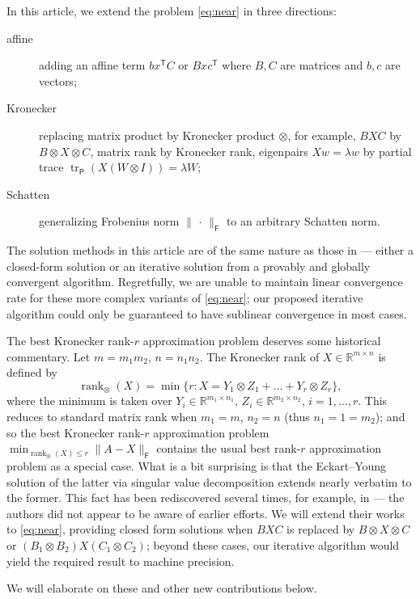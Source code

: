 \documentclass[11pt,reqno]{amsart}
\newcommand{\tp}{{\scriptscriptstyle\mathsf{T}}}
\newcommand{\F}{{\scriptscriptstyle\mathsf{F}}}
\newcommand{\Par}{{\scriptscriptstyle\mathsf{P}}}
\DeclareMathOperator{\rank}{rank}
\DeclareMathOperator{\tr}{tr}
\theoremstyle{definition}
\numberwithin{equation}{section}
\newcommand{\R}{\mathbb{R}}
\begin{document}
In this article, we extend the problem \eqref{eq:near} in three directions:
\begin{description}
\item[affine] adding an affine term $bx^\tp C$ or $Bx c^\tp$ where $B,C$ are matrices and $b,c$ are vectors;

\item[Kronecker] replacing matrix product by Kronecker product $\otimes$, for example, $BXC$ by $B \otimes X \otimes C$, matrix rank by Kronecker rank, eigenpairs $Xw = \lambda w$ by partial trace $\tr_\Par(X(W \otimes I)) = \lambda W$;

\item[Schatten] generalizing Frobenius norm $\lVert \, \cdot \, \rVert_\F$ to an arbitrary Schatten norm.
\end{description}
The solution methods in this article are of the same nature as those in \cite{li22}  --- either a closed-form solution or an iterative solution from a provably and globally convergent algorithm. Regretfully, we are unable to maintain linear convergence rate for these more complex variants of \eqref{eq:near}; our proposed iterative algorithm could only be guaranteed to have sublinear convergence in most cases.

The best Kronecker rank-$r$ approximation problem deserves some historical commentary. Let $m = m_1 m_2$, $n = n_1n_2$. The Kronecker rank of $X \in  \mathbb{R}^{m \times n}$ is defined by
\[
\rank_\otimes(X) = \min \{ r : X = Y_1 \otimes Z_1 + \dots + Y_r \otimes Z_r\},
\]
where the minimum is taken over $Y_i \in \R^{m_1 \times n_1}$, $Z_i \in \R^{m_2 \times n_2}$, $i =1,\dots,r$. This reduces to standard matrix rank when $m_1 = m$, $n_2 = n$ (thus $n_1 = 1 = m_2$); and so the best Kronecker rank-$r$ approximation problem $\min_{\rank_\otimes(X) \le r} \lVert A- X\rVert_\F $ contains the usual  best rank-$r$ approximation problem as a special case. What is a bit surprising is that the Eckart--Young solution of the latter \cite{Eck} via singular value decomposition extends nearly verbatim to the former. This fact has been rediscovered several times, for example, in \cite{allen,kon, vanLoan} --- the authors did not appear to be aware of earlier efforts. We will extend their works to \eqref{eq:near}, providing closed form solutions when $BXC$ is replaced by $B \otimes X \otimes C$ or $(B_1 \otimes B_2)X(C_1 \otimes C_2)$; beyond these cases, our iterative algorithm would yield the required result to machine precision.

We will elaborate on these and other new contributions below.
\end{document}

